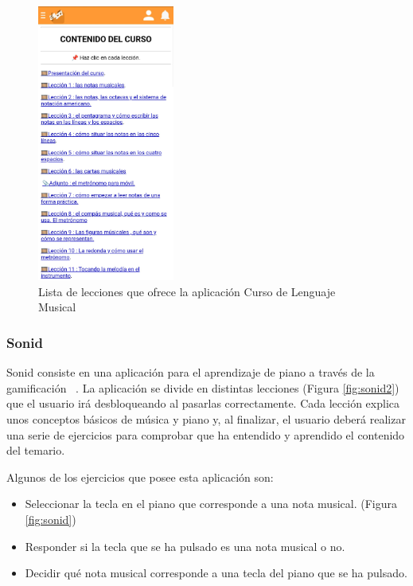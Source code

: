\begin{figure}[H]
    \centering
    \includegraphics[width=0.4\textwidth]{imagenes/c2/cursomusica.jpeg}
    \caption{Lista de lecciones que ofrece la aplicación Curso de Lenguaje Musical}
    \label{fig:clm}
\end{figure}


\subsubsection{Sonid}
Sonid consiste en una aplicación para el aprendizaje de piano a través de la gamificación ~\cite{Sonid}.
La aplicación se divide en distintas lecciones (Figura \ref{fig:sonid2}) que el usuario irá desbloqueando al pasarlas correctamente.
Cada lección explica unos conceptos básicos de música y piano y, al finalizar, el usuario deberá realizar una serie
de ejercicios para comprobar que ha entendido y aprendido el contenido del temario.

Algunos de los ejercicios que posee esta aplicación son:
\begin{itemize}
    \item Seleccionar la tecla en el piano que corresponde a una nota musical. (Figura \ref{fig:sonid})
    \item Responder si la tecla que se ha pulsado es una nota musical o no.
    \item Decidir qué nota musical corresponde a una tecla del piano que se ha pulsado.
\end{itemize}

